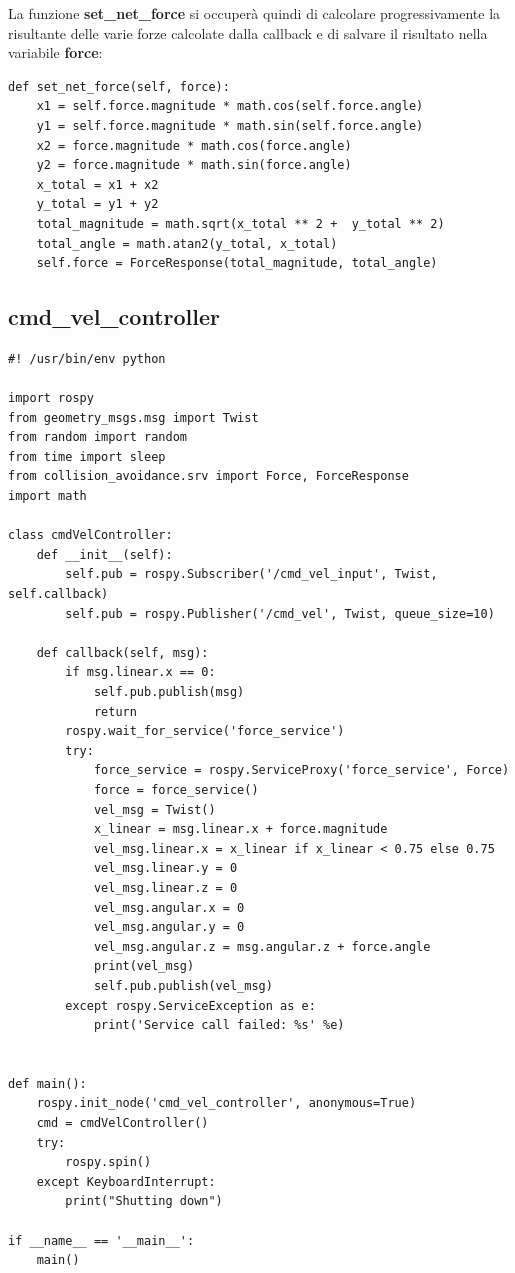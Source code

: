 \documentclass[Lau, binding=0.6cm, oneside]{sapthesis}
\begin{document}
La funzione \textbf{set\_net\_force} si occuperà quindi di calcolare progressivamente la risultante delle varie forze calcolate dalla callback e di salvare il risultato nella variabile \textbf{force}:

\begin{lstlisting}
def set_net_force(self, force):
    x1 = self.force.magnitude * math.cos(self.force.angle)
    y1 = self.force.magnitude * math.sin(self.force.angle)
    x2 = force.magnitude * math.cos(force.angle)
    y2 = force.magnitude * math.sin(force.angle)
    x_total = x1 + x2
    y_total = y1 + y2
    total_magnitude = math.sqrt(x_total ** 2 +  y_total ** 2)
    total_angle = math.atan2(y_total, x_total)
    self.force = ForceResponse(total_magnitude, total_angle)
\end{lstlisting}

\subsection{cmd\_vel\_controller}
\begin{lstlisting}
#! /usr/bin/env python

import rospy
from geometry_msgs.msg import Twist
from random import random
from time import sleep
from collision_avoidance.srv import Force, ForceResponse
import math

class cmdVelController:
    def __init__(self):
        self.pub = rospy.Subscriber('/cmd_vel_input', Twist, self.callback)
        self.pub = rospy.Publisher('/cmd_vel', Twist, queue_size=10)
    
    def callback(self, msg):
        if msg.linear.x == 0:
            self.pub.publish(msg)
            return
        rospy.wait_for_service('force_service')
        try:
            force_service = rospy.ServiceProxy('force_service', Force)
            force = force_service()
            vel_msg = Twist()
            x_linear = msg.linear.x + force.magnitude
            vel_msg.linear.x = x_linear if x_linear < 0.75 else 0.75
            vel_msg.linear.y = 0
            vel_msg.linear.z = 0
            vel_msg.angular.x = 0
            vel_msg.angular.y = 0
            vel_msg.angular.z = msg.angular.z + force.angle
            print(vel_msg)
            self.pub.publish(vel_msg)
        except rospy.ServiceException as e:
            print('Service call failed: %s' %e)


def main():
    rospy.init_node('cmd_vel_controller', anonymous=True)
    cmd = cmdVelController()
    try:
        rospy.spin()
    except KeyboardInterrupt:
        print("Shutting down")

if __name__ == '__main__':
    main()
\end{lstlisting}
\end{document}

